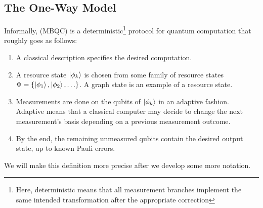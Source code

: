 
\subsection{The One-Way Model}

\begin{definition}
Informally,  (MBQC) is a deterministic\footnote{Here, deterministic means that all measurement branches implement the same intended transformation after the appropriate correction} protocol for quantum computation that roughly goes as follows:
\begin{enumerate}
    \item A classical description specifies the desired computation.
    \item A resource state $\ket{\phi_k}$ is chosen from some family of resource states $\Phi = \{ \ket{\phi_1}, \ket{\phi_2}, \ldots \}$. A graph state is an example of a resource state.
    \item Measurements are done on the qubits of $\ket{\phi_k}$ in an adaptive fashion. Adaptive means that a classical computer may decide to change the next measurement's basis depending on a previous measurement outcome.
    \item By the end, the remaining unmeasured qubits contain the desired output state, up to known Pauli errors.
\end{enumerate}
We will make this definition more precise after we develop some more notation.
\end{definition}

